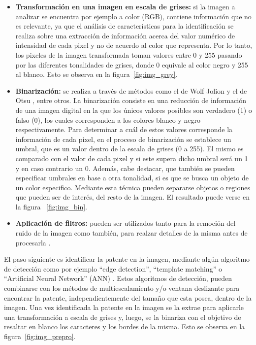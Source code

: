 \begin{itemize}
	\item \textbf{Transformación en una imagen en escala de grises:}
si la imagen a analizar se encuentra por ejemplo a color (RGB), contiene información que no es relevante, ya que el análisis de características para la identificación se realiza sobre una extracción de información acerca del valor numérico de intensidad de cada pixel y no de acuerdo al color que representa. Por lo tanto, los pixeles de la imagen transformada toman valores entre 0 y 255 pasando por las diferentes tonalidades de grises, donde 0 equivale al color negro y 255 al blanco.  Esto se observa en la figura~\ref{fig:img_grey}.

\item \textbf{Binarización:}
se realiza a través de métodos como el de Wolf Jolion \cite{wolf2004} y el de Otsu \cite{Image_Binarization_using_Otsu_Thresholdi}, entre otros. La binarización consiste en una reducción de información de una imagen digital en la que los únicos valores posibles son verdadero (1) o falso (0), los cuales corresponden a los colores blanco y negro respectivamente. Para determinar a cuál de estos valores corresponde la información de cada pixel, en el proceso de binarización se establece un umbral, que es un valor dentro de la escala de grises (0 a 255). El mismo es comparado con el valor de cada pixel y si este supera dicho umbral será un 1 y en caso contrario un 0. Además, cabe destacar, que también se pueden especificar umbrales en base a otra tonalidad, si es que se busca un objeto de un color especifico. Mediante esta técnica pueden separarse objetos o regiones que pueden ser de interés, del resto de la imagen. El resultado puede verse en la figura ~\ref{fig:img_bin}.


\item \textbf{Aplicación de filtros:}
pueden ser utilizados tanto para la remoción del ruido de la imagen como también, para realzar detalles de la misma antes de procesarla \cite{navacerrada}.
\end{itemize}

El paso siguiente es identificar la patente en la imagen, mediante algún algoritmo de detección como por ejemplo “edge detection”, “template matching” o “Artificial Neural Network” (ANN) \cite{LicensePlates2018}\cite{0a392c343021f65fa374375e148cb5770a88}. Estos algoritmos de detección, pueden combinarse con los métodos de multiescalamiento y/o ventana deslizante para encontrar la patente, independientemente del tamaño que esta posea, dentro de la imagen. 
Una vez identificada la patente en la imagen se la extrae para aplicarle una transformación a escala de grises y, luego, se la binariza con el objetivo de resaltar en blanco los caracteres y los bordes de la misma. Esto se observa en la figura~\ref{fig:img_prepro}.

